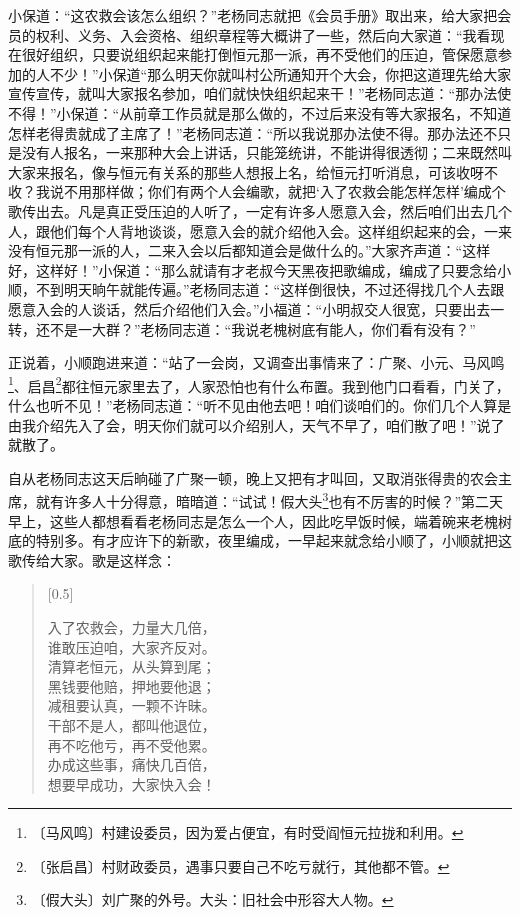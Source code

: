 \documentclass[12pt,UTF-8,openany]{ctexbook}
\begin{document}
\begin{normalsize}
    小保道：“这农救会该怎么组织？”老杨同志就把《会员手册》取出来，给大家把会员的权利、义务、入会资格、组织章程等大概讲了一些，然后向大家道：“我看现在很好组织，只要说组织起来能打倒恒元那一派，再不受他们的压迫，管保愿意参加的人不少！”小保道“那么明天你就叫村公所通知开个大会，你把这道理先给大家宣传宣传，就叫大家报名参加，咱们就快快组织起来干！”老杨同志道：“那办法使不得！”小保道：“从前章工作员就是那么做的，不过后来没有等大家报名，不知道怎样老得贵就成了主席了！”老杨同志道：“所以我说那办法使不得。那办法还不只是没有人报名，一来那种大会上讲话，只能笼统讲，不能讲得很透彻；二来既然叫大家来报名，像与恒元有关系的那些人想报上名，给恒元打听消息，可该收呀不收？我说不用那样做；你们有两个人会编歌，就把‘入了农救会能怎样怎样’编成个歌传出去。凡是真正受压迫的人听了，一定有许多人愿意入会，然后咱们出去几个人，跟他们每个人背地谈谈，愿意入会的就介绍他入会。这样组织起来的会，一来没有恒元那一派的人，二来入会以后都知道会是做什么的。”大家齐声道：“这样好，这样好！”小保道：“那么就请有才老叔今天黑夜把歌编成，编成了只要念给小顺，不到明天晌午就能传遍。”老杨同志道：“这样倒很快，不过还得找几个人去跟愿意入会的人谈话，然后介绍他们入会。”小福道：“小明叔交人很宽，只要出去一转，还不是一大群？”老杨同志道：“我说老槐树底有能人，你们看有没有？”
    
    正说着，小顺跑进来道：“站了一会岗，又调查出事情来了：广聚、小元、马风鸣\footnote{〔马风鸣〕村建设委员，因为爱占便宜，有时受阎恒元拉拢和利用。}、启昌\footnote{〔张启昌〕村财政委员，遇事只要自己不吃亏就行，其他都不管。}都往恒元家里去了，人家恐怕也有什么布置。我到他门口看看，门关了，什么也听不见！”老杨同志道：“听不见由他去吧！咱们谈咱们的。你们几个人算是由我介绍先入了会，明天你们就可以介绍别人，天气不早了，咱们散了吧！”说了就散了。
    
    自从老杨同志这天后晌碰了广聚一顿，晚上又把有才叫回，又取消张得贵的农会主席，就有许多人十分得意，暗暗道：“试试！假大头\footnote{〔假大头〕刘广聚的外号。大头：旧社会中形容大人物。}也有不厉害的时候？”第二天早上，这些人都想看看老杨同志是怎么一个人，因此吃早饭时候，端着碗来老槐树底的特别多。有才应许下的新歌，夜里编成，一早起来就念给小顺了，小顺就把这歌传给大家。歌是这样念：
    
    \begin{verse}[0.5\linewidth]
    
    入了农救会，力量大几倍，\\谁敢压迫咱，大家齐反对。\\清算老恒元，从头算到尾；\\黑钱要他赔，押地要他退；\\减租要认真，一颗不许昧。\\干部不是人，都叫他退位，\\再不吃他亏，再不受他累。\\办成这些事，痛快几百倍，\\想要早成功，大家快入会！
    

\end{verse}
\end{normalsize}
\end{document}
